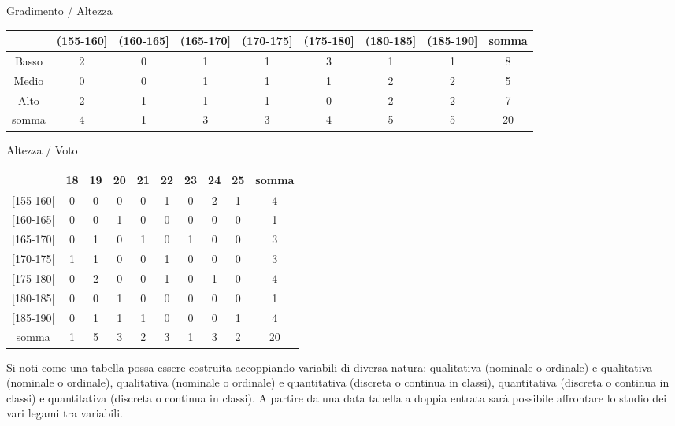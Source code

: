 \begin{center}
\vspace{1em}
Gradimento / Altezza\\
\begin{tabular}{cccccccc|c}
        \hline
&{\scriptsize (155-160]} & {\scriptsize (160-165]}
&{\scriptsize (165-170]} & {\scriptsize (170-175]}
&{\scriptsize (175-180]} & {\scriptsize (180-185]}
&{\scriptsize (185-190]} & {\scriptsize somma}\\  
\hline
Basso &  2 &  0 &  1 &  1 &  3 &  1 &  1 &   8\\
Medio &  0 &  0 &  1 &  1 &  1 &  2 &  2 &   5\\
Alto  &  2 &  1 &  1 &  1 &  0 &  2 &  2 &   7\\
\hline
somma &  4 &  1 &  3 &  3 &  4 &  5 &  5 &  20\\
\end{tabular}

\vspace{1em}
Altezza / Voto\\ 
\begin{tabular}{ccccccccc|c}
        \hline
            &  18 &  19 &  20 &  21 &  22 &  23 &  24 &  25 & somma\\ 
\hline
{[155-160[} &   0 &   0 &   0 &   0 &   1 &   0 &   2 &   1 &     4\\
{[160-165[} &   0 &   0 &   1 &   0 &   0 &   0 &   0 &   0 &     1\\
{[165-170[} &   0 &   1 &   0 &   1 &   0 &   1 &   0 &   0 &     3\\
{[170-175[} &   1 &   1 &   0 &   0 &   1 &   0 &   0 &   0 &     3\\
{[175-180[} &   0 &   2 &   0 &   0 &   1 &   0 &   1 &   0 &     4\\
{[180-185[} &   0 &   0 &   1 &   0 &   0 &   0 &   0 &   0 &     1\\
{[185-190[} &   0 &   1 &   1 &   1 &   0 &   0 &   0 &   1 &     4\\
\hline
somma       &   1 &   5 &   3 &   2 &   3 &   1 &   3 &   2 &    20\\
\end{tabular}
\end{center}

\vspace{6pt}
Si noti come una tabella possa essere costruita accoppiando variabili di 
diversa natura: qualitativa (nominale o ordinale) e qualitativa (nominale o 
ordinale), qualitativa (nominale o ordinale) e quantitativa (discreta o 
continua in classi), quantitativa (discreta o continua in classi) e 
quantitativa (discreta o continua in classi). A partire da una data tabella 
a doppia entrata sarà possibile affrontare lo studio dei vari legami tra 
variabili.

